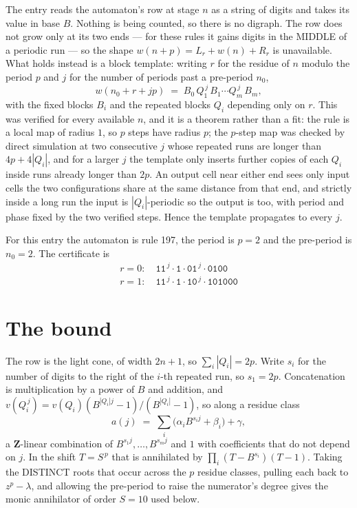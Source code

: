 \documentclass[11pt,a4paper]{article}
\theoremstyle{plain}
\theoremstyle{definition}
\begin{document}
The entry reads the automaton's row at stage $n$ as a string of digits and takes its value in
base $B$. Nothing is being counted, so there is no digraph. The row does not grow only at its
two ends --- for these rules it gains digits in the MIDDLE of a periodic run --- so the shape
$w(n+p)=L_r+w(n)+R_r$ is unavailable. What holds instead is a block template: writing $r$ for
the residue of $n$ modulo the period $p$ and $j$ for the number of periods past a pre-period
$n_0$,
\[
w(n_0 + r + jp)\;=\;B_0\,Q_1^{\,j}\,B_1\cdots Q_m^{\,j}\,B_m,
\]
with the fixed blocks $B_i$ and the repeated blocks $Q_i$ depending only on $r$. This was
verified for every available $n$, and it is a theorem rather than a fit: the rule is a local
map of radius $1$, so $p$ steps have radius $p$; the $p$-step map was checked by direct
simulation at two consecutive $j$ whose repeated runs are longer than $4p+4|Q_i|$, and for a
larger $j$ the template only inserts further copies of each $Q_i$ inside runs already longer
than $2p$. An output cell near either end sees only input cells the two configurations share
at the same distance from that end, and strictly inside a long run the input is
$|Q_i|$-periodic so the output is too, with period and phase fixed by the two verified steps.
Hence the template propagates to every $j$.

For this entry the automaton is rule 197, the period is $p=2$ and the pre-period is $n_0=2$.
The certificate is
\begin{gather*}
r=0:\quad \texttt{11}^{\,j} \cdot \texttt{1} \cdot \texttt{01}^{\,j} \cdot \texttt{0100} \\
r=1:\quad \texttt{11}^{\,j} \cdot \texttt{1} \cdot \texttt{10}^{\,j} \cdot \texttt{101000}
\end{gather*}

\section{The bound}

The row is the light cone, of width $2n+1$, so $\sum_i|Q_i|=2p$. Write $s_i$ for the number of
digits to the right of the $i$-th repeated run, so $s_1=2p$. Concatenation is multiplication by
a power of $B$ and addition, and $v(Q_i^{\,j})=v(Q_i)(B^{|Q_i|j}-1)/(B^{|Q_i|}-1)$, so along a
residue class
\[
a(j)\;=\;\sum_i \big(\alpha_i B^{s_i j} + \beta_i\big) + \gamma,
\]
a $\mathbf{Z}$-linear combination of $B^{s_1 j},\dots,B^{s_m j}$ and $1$ with coefficients that
do not depend on $j$. In the shift $T=S^{\,p}$ that is annihilated by
$\prod_i(T-B^{s_i})(T-1)$. Taking the DISTINCT roots that occur across the $p$ residue classes,
pulling each back to $z^p-\lambda$, and allowing the pre-period to raise the numerator's degree
gives the monic annihilator of order $S=10$ used below.
\end{document}

